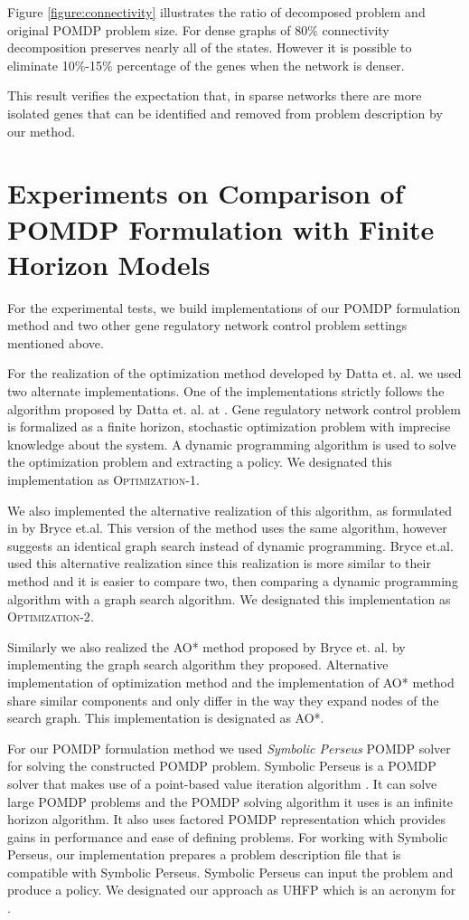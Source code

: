 Figure \ref{figure:connectivity} illustrates the ratio of decomposed problem and original POMDP problem size. For dense graphs of 80\% connectivity decomposition preserves nearly all of the states. However it is possible to eliminate 10\%-15\% percentage of the genes when the network is denser.

This result verifies the expectation that, in sparse networks there are more isolated genes that can be identified and removed from problem description by our method.

\section{Experiments on Comparison of POMDP Formulation with Finite Horizon Models}

For the experimental tests, we build implementations of our POMDP formulation method and two other 
gene regulatory network control problem settings mentioned above. 

For the realization of the optimization method developed by Datta et. al. we used two alternate implementations. 
One of the implementations strictly follows the algorithm proposed by Datta et. al. at \cite{Datta04}. Gene 
regulatory network control problem is formalized as a finite horizon, stochastic optimization problem 
with imprecise knowledge about the system. A dynamic programming algorithm is used to solve the optimization
problem and extracting a policy. We designated this implementation as \textsc{Optimization-1}.

We also implemented the alternative realization of this algorithm, as formulated in \cite{Bryce06} 
by Bryce et.al. This version of the method uses the same algorithm, however suggests an identical  graph search 
instead of dynamic programming. Bryce et.al. used this alternative realization since this realization is more 
similar to their method and it is easier to compare two, then comparing a dynamic programming algorithm with a 
graph search algorithm. We designated this implementation as \textsc{Optimization-2}.

Similarly we also realized the AO* method proposed by Bryce et. al. by implementing 
the graph search algorithm they proposed. Alternative implementation of optimization method and the 
implementation of AO* method share similar components and only differ in the way they expand nodes of 
the search graph. This implementation is designated as \textsc{AO*}.

For our POMDP formulation method we used \emph{Symbolic Perseus} POMDP solver for solving the constructed 
POMDP problem. Symbolic Perseus is a POMDP solver that makes use of a point-based value iteration algorithm
\cite{Poupart05}. It can solve large POMDP problems and the POMDP solving algorithm it uses is an infinite horizon
algorithm. It also uses factored POMDP representation which provides gains in performance and ease of 
defining problems. For working with Symbolic Perseus, our implementation prepares a problem description 
file that is compatible with Symbolic Perseus. Symbolic Perseus can input the problem and produce a policy. 
We designated our approach as \textsc{UHFP} which is an acronym for    .

